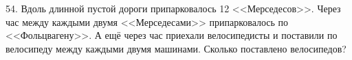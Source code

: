 54. Вдоль длинной пустой дороги припарковалось 12 <<Мерседесов>>. Через час между каждыми двумя <<Мерседесами>> припарковалось по <<Фольцвагену>>. А ещё через час приехали велосипедисты и поставили по велосипеду между каждыми двумя машинами. Сколько поставлено велосипедов?\\
